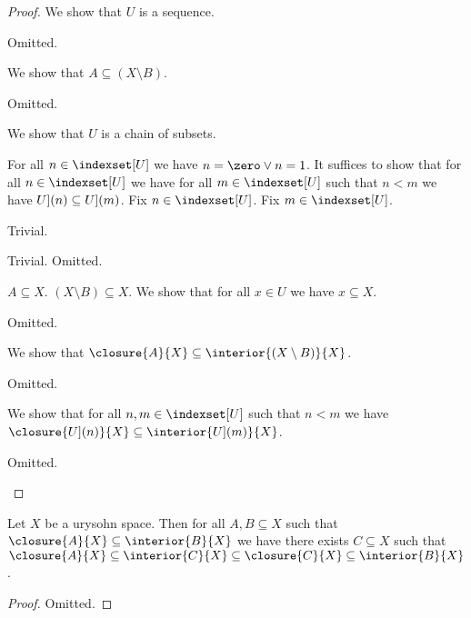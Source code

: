 \begin{proof}
    We show that $U$ is a sequence.
    \begin{subproof}
        Omitted.
    \end{subproof}

    We show that $A \subseteq (X \setminus B)$.
    \begin{subproof}
        Omitted.
    \end{subproof}

    We show that $U$ is a chain of subsets.
    \begin{subproof}
        For all $n \in \indexset[U]$ we have $n = \zero \lor n = 1$.
        It suffices to show that for all $n \in \indexset[U]$ we have
        for all $m \in \indexset[U]$ such that 
        $n < m$ we have $\index[U](n) \subseteq \index[U](m)$.
        Fix $n \in \indexset[U]$.
        Fix $m \in \indexset[U]$.
        \begin{byCase}
             Trivial.
                \begin{byCase}
                     Trivial.
                     Omitted.
                \end{byCase}
        \end{byCase}
    \end{subproof}

    $A \subseteq X$.
    $(X \setminus B) \subseteq X$.
    We show that for all $x \in U$ we have $x \subseteq X$.
    \begin{subproof}
        Omitted.
    \end{subproof}

    We show that $\closure{A}{X} \subseteq \interior{(X \setminus B)}{X}$.
    \begin{subproof}
        Omitted.
    \end{subproof}
    We show that for all $n,m \in \indexset[U]$ such that $n < m$ we have
    $\closure{\index[U](n)}{X} \subseteq \interior{\index[U](m)}{X}$.
    \begin{subproof}
        Omitted.
    \end{subproof}
\end{proof}


\begin{proposition}\label{t_four_propositon}
    Let $X$ be a urysohn space.
    Then for all $A,B \subseteq X$ such that $\closure{A}{X} \subseteq \interior{B}{X}$
    we have there exists $C \subseteq X$ such that 
    $\closure{A}{X} \subseteq \interior{C}{X} \subseteq \closure{C}{X} \subseteq \interior{B}{X}$.
\end{proposition}
\begin{proof}
    Omitted.
\end{proof}

